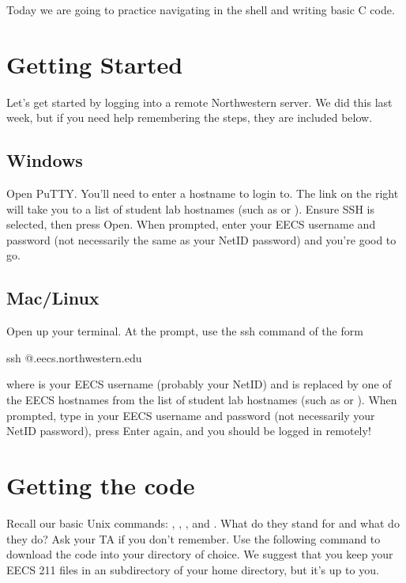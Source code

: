 \documentclass{tufte-handout}
\begin{document}
\maketitle

Today we are going to practice navigating in the shell and writing basic C code. 

\section{Getting Started}
Let's get started by logging into a remote Northwestern server. We did this last week, but if you need help remembering the steps, they are included below.

\subsection{Windows}
Open PuTTY. You'll need to enter a hostname to login to. The link on the right will take you to a list of student lab hostnames (such as   or ).  Ensure SSH is selected, then press Open. When prompted, enter your EECS username and password (not necessarily the same as your NetID password) and you're good to go.

\subsection{Mac/Linux}
Open up your terminal. At the prompt, use the ssh command of the form
\begin{CmdLine}
  \prompt ssh @.eecs.northwestern.edu
\end{CmdLine}
\noindent where  is your EECS username (probably your NetID)
and  is replaced by one of the EECS hostnames from the list
of student lab hostnames (such as  or
).
When prompted, type in your EECS username and password (not necessarily your NetID password), press
Enter again, and you should be logged in remotely!

\section{Getting the code}
Recall our basic Unix commands: , , , and . What do they stand for and what do they do? Ask your TA if you don't remember. Use the following  command to download the code into your directory of choice. We suggest that you keep your EECS 211 files in an  subdirectory of your home directory, but it's up to you.
\end{document}
